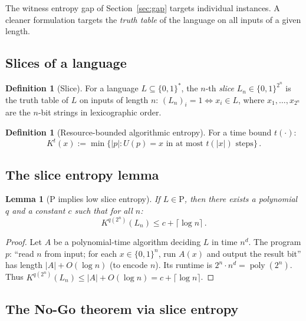 \documentclass[aps,prd,twocolumn,superscriptaddress,nofootinbib]{revtex4-2}
\newtheorem{lemma}[theorem]{Lemma}
\theoremstyle{definition}
\newtheorem{definition}[theorem]{Definition}
\theoremstyle{remark}
\DeclareMathOperator{\poly}{poly}
\newcommand{\PP}{\mathrm{P}}
\begin{document}
The witness entropy gap of Section~\ref{sec:gap} targets individual instances. A cleaner formulation targets the \textit{truth table} of the language on all inputs of a given length.

\subsection{Slices of a language}

\begin{definition}[Slice]
For a language $L \subseteq \{0,1\}^*$, the $n$-th \textit{slice} $L_n \in \{0,1\}^{2^n}$ is the truth table of $L$ on inputs of length $n$: $(L_n)_i = 1 \iff x_i \in L$, where $x_1, \ldots, x_{2^n}$ are the $n$-bit strings in lexicographic order.
\end{definition}

\begin{definition}[Resource-bounded algorithmic entropy]
For a time bound $t(\cdot)$:
\begin{equation}
K^t(x) := \min\{|p| : U(p) = x \text{ in at most } t(|x|) \text{ steps}\}\,.
\label{eq:Kt}
\end{equation}
\end{definition}

\subsection{The slice entropy lemma}

\begin{lemma}[P implies low slice entropy]
\label{lem:p_low_entropy}
If $L \in \PP$, then there exists a polynomial $q$ and a constant $c$ such that for all $n$:
\begin{equation}
K^{q(2^n)}(L_n) \leq c + \lceil \log n \rceil\,.
\label{eq:p_entropy}
\end{equation}
\end{lemma}

\begin{proof}
Let $A$ be a polynomial-time algorithm deciding $L$ in time $n^d$. The program $p$: ``read $n$ from input; for each $x \in \{0,1\}^n$, run $A(x)$ and output the result bit'' has length $|A| + O(\log n)$ (to encode $n$). Its runtime is $2^n \cdot n^d = \poly(2^n)$. Thus $K^{q(2^n)}(L_n) \leq |A| + O(\log n) = c + \lceil \log n \rceil$.
\end{proof}

\subsection{The No-Go theorem via slice entropy}
\end{document}
